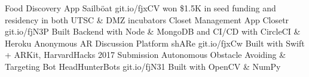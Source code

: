 \begin{cvhonors}
  \cvhonor
    {Food Discovery App}
    {Sailböat}
    {}
    {git.io/fjxCV}
    {won \$1.5K in seed funding and residency in both UTSC \& DMZ incubators}
  \cvhonor
    {Closet Management App}
    {Closetr}
    {}
    {git.io/fjN3P}
    {Built Backend with Node \& MongoDB and CI/CD with CircleCI \& Heroku}
  \cvhonor
    {Anonymous AR Discussion Platform}
    {shARe}
    {}
    {git.io/fjxCw}
    {Built with Swift + ARKit, HarvardHacks 2017 Submission}
  \cvhonor
    {Autonomous Obstacle Avoiding \& Targeting Bot}
    {HeadHunterBots}
    {}
    {git.io/fjN31}
    {Built with OpenCV \& NumPy}
\end{cvhonors}
